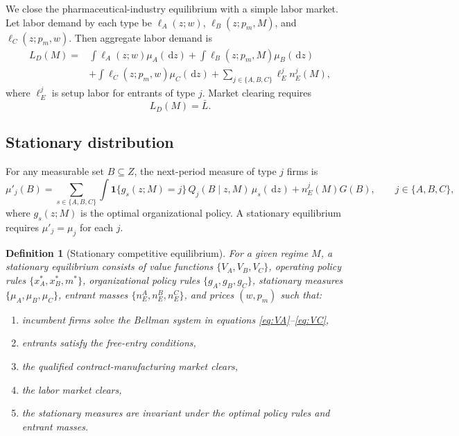\documentclass[12pt]{article}
\newtheorem{definition}{Definition}
\newcommand{\1}{\mathbf{1}}
\newcommand{\dd}{\,\mathrm{d}}
\newcommand{\Lbar}{\bar L}
\begin{document}
We close the pharmaceutical-industry equilibrium with a simple labor market. Let labor demand by each type be $\ell_A(z;w)$, $\ell_B(z;p_m,M)$, and $\ell_C(z;p_m,w)$. Then aggregate labor demand is
\begin{equation}
\begin{aligned}
L_D(M)={}&\int \ell_A(z;w)\mu_A(\dd z)+\int \ell_B(z;p_m,M)\mu_B(\dd z)\\
&+\int \ell_C(z;p_m,w)\mu_C(\dd z)+\sum_{j\in\{A,B,C\}}\ell_E^j n_E^j(M),
\end{aligned}
\label{eq:labor_demand}
\end{equation}
where $\ell_E^j$ is setup labor for entrants of type $j$. Market clearing requires
\begin{equation}
L_D(M)=\Lbar.
\label{eq:labor_clear}
\end{equation}

\subsection{Stationary distribution}

For any measurable set $B\subseteq Z$, the next-period measure of type $j$ firms is
\begin{equation}
\mu'_j(B)
=
\sum_{s\in\{A,B,C\}}\int \1\{g_s(z;M)=j\}\,Q_j(B\mid z,M)\,\mu_s(\dd z)
+n_E^j(M)G(B),
\qquad j\in\{A,B,C\},
\label{eq:stationary_measure}
\end{equation}
where $g_s(z;M)$ is the optimal organizational policy. A stationary equilibrium requires $\mu'_j=\mu_j$ for each $j$.

\begin{definition}[Stationary competitive equilibrium]
For a given regime $M$, a stationary equilibrium consists of value functions $\{V_A,V_B,V_C\}$, operating policy rules $\{x_A^*,x_B^*,m^*\}$, organizational policy rules $\{g_A,g_B,g_C\}$, stationary measures $\{\mu_A,\mu_B,\mu_C\}$, entrant masses $\{n_E^A,n_E^B,n_E^C\}$, and prices $(w,p_m)$ such that:
\begin{enumerate}[leftmargin=2em]
    \item incumbent firms solve the Bellman system in equations \eqref{eq:VA}--\eqref{eq:VC},
    \item entrants satisfy the free-entry conditions,
    \item the qualified contract-manufacturing market clears,
    \item the labor market clears,
    \item the stationary measures are invariant under the optimal policy rules and entrant masses.
\end{enumerate}
\end{definition}
\end{document}
